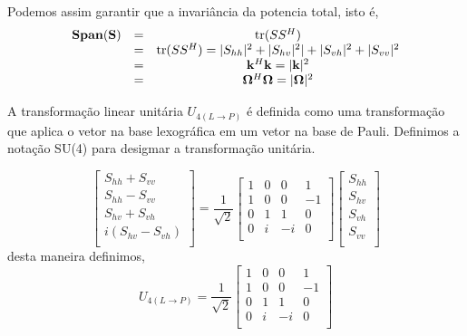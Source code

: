 Podemos assim garantir que a invariância da potencia total, isto é, 
\begin{equation}\label{span_invariacia}
\begin{array}{ccc}
\mathbf{Span(S)} &=& \operatorname{tr}(SS^H)\\
	   &=&  \operatorname{tr}(SS^H)=|S_{hh}|^2+|S_{hv}|^2|+|S_{vh}|^2+|S_{vv}|^2  \\
	   &=&  \mathbf{k}^H\mathbf{k}=|\mathbf{k}|^2\\
	   &=& \mathbf{\Omega}^H\mathbf{\Omega}=|\mathbf{\Omega}|^2
\end{array}
\end{equation}

A transformação linear unitária $U_{4(L \rightarrow P)}$ é definida como uma transformação que aplica o vetor na base lexográfica em um vetor na base de Pauli. Definimos a notação \textrm{SU(4)} para desigmar a transformação  unitária.

\begin{equation}\label{trans_matriz_unit_su4}
\left[
\begin{array}{c}
	  S_{hh} +  S_{vv}\\  
	  S_{hh} -  S_{vv}\\
	  S_{hv} +  S_{vh} \\
        i(S_{hv} -  S_{vh}) \\
\end{array}
\right]=\frac{1}{\sqrt{2}}	
\left[
\begin{array}{rrrr}
	1   & 0 & 0 & 1  \\
	1   & 0 & 0 & -1  \\
	0   & 1 & 1 & 0  \\
	0   & i & -i &0   \\
\end{array}
\right]
\left[
\begin{array}{c}
	S_{hh} \\  
	S_{hv} \\
	S_{vh} \\
	S_{vv} \\
\end{array}
\right]
\end{equation}
desta maneira definimos,
\begin{equation}\label{matriz_unit_su4}
U_{4(L \rightarrow P)}=	\frac{1}{\sqrt{2}}	
\left[
\begin{array}{rrrr}
	1   & 0 & 0 & 1  \\
	1   & 0 & 0 & -1  \\
	0   & 1 & 1 & 0  \\
	0   & i & -i &0   \\
\end{array}
\right]
\end{equation}
